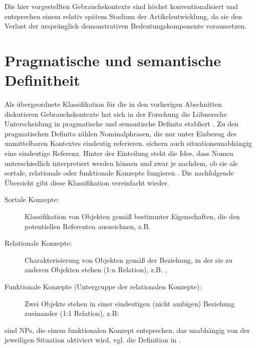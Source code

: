 Die hier vorgestellten Gebrauchskontexte sind höchst konventionalisiert und entsprechen einem relativ spätem Stadium der Artikelentwicklung, da sie den Verlust der ursprünglich demonstrativen Bedeutungskomponente voraussetzen.


\section{Pragmatische und semantische Definitheit}\label{sec:pragsem}

Als übergeordnete Klassifikation für die in den vorherigen Abschnitten diskutieren Gebrauchskontexte hat sich in der Forschung die Löbnersche Unterscheidung in pragmatische  und semantische Definita  \parencite{Lobner1985} etabliert \parencite{Himmelmann1997, Demske2001,Nubling2005,Napoli2009,Szczepaniak2011a}. Zu den pragmatischen Definita  zählen  Nominalphrasen, die nur unter Einbezug des unmittelbaren Kontextes eindeutig referieren.  sichern auch situationsunabhängig eine eindeutige Referenz. Hinter der Einteilung steht die Idee, dass Nomen unterschiedlich interpretiert werden können und zwar je nachdem, ob sie als sortale, relationale oder funktionale Konzepte fungieren \parencite{Lobner1985,Lobner1998}. Die nachfolgende Übersicht gibt diese Klassifikation vereinfacht wieder. 

\begin{description} 
		\item[Sortale Konzepte:] \label{sort} Klassifikation von Objekten gemäß bestimmter Eigenschaften, die den potentiellen Referenten auszeichnen, z.B.  
		\item[Relationale Konzepte:] \label{relat} Charakterisierung von Objekten gemäß der Beziehung, in der sie zu anderen Objekten stehen (1:n Relation), z.B. ,  
		\item[Funktionale Konzepte (Untergruppe der relationalen Konzepte):] \label{funkt} Zwei Objekte stehen in einer eindeutigen (nicht ambigen) Beziehung zueinander (1:1 Relation), z.B:  
\end{description} 

\noindent
{} sind  NPs, die einem funktionalen Konzept entsprechen, das unabhängig von der jeweiligen Situation aktiviert wird, vgl. die Definition in . 


